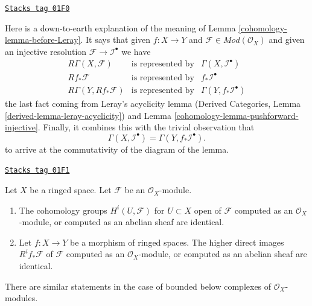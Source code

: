\begin{remark}
\label{cohomology-remark-elucidate-lemma}
\href{https://stacks.math.columbia.edu/tag/01F0}{\texttt{Stacks tag 01F0}}

Here is a down-to-earth explanation of the meaning of
Lemma \ref{cohomology-lemma-before-Leray}. It says that given
$f : X \to Y$ and $\mathcal{F} \in \textit{Mod}(\mathcal{O}_X)$
and given an injective resolution $\mathcal{F} \to \mathcal{I}^\bullet$
we have
$$
\begin{matrix}
R\Gamma(X, \mathcal{F}) & \text{is represented by} &
\Gamma(X, \mathcal{I}^\bullet) \\
Rf_*\mathcal{F} & \text{is represented by} & f_*\mathcal{I}^\bullet \\
R\Gamma(Y, Rf_*\mathcal{F}) & \text{is represented by} &
\Gamma(Y, f_*\mathcal{I}^\bullet)
\end{matrix}
$$
the last fact coming from Leray's acyclicity lemma
(Derived Categories, Lemma \ref{derived-lemma-leray-acyclicity})
and Lemma \ref{cohomology-lemma-pushforward-injective}.
Finally, it combines this with the trivial observation that
$$
\Gamma(X, \mathcal{I}^\bullet)
=
\Gamma(Y, f_*\mathcal{I}^\bullet).
$$
to arrive at the commutativity of the diagram of the lemma.
\end{remark}

\begin{lemma}
\label{cohomology-lemma-modules-abelian}
\href{https://stacks.math.columbia.edu/tag/01F1}{\texttt{Stacks tag 01F1}}

Let $X$ be a ringed space.
Let $\mathcal{F}$ be an $\mathcal{O}_X$-module.
\begin{enumerate}
\item The cohomology groups $H^i(U, \mathcal{F})$ for $U \subset X$ open
of $\mathcal{F}$ computed as an $\mathcal{O}_X$-module, or computed as an
abelian sheaf are identical.
\item Let $f : X \to Y$ be a morphism of ringed spaces.
The higher direct images $R^if_*\mathcal{F}$ of $\mathcal{F}$
computed as an $\mathcal{O}_X$-module, or computed as an abelian sheaf
are identical.
\end{enumerate}
There are similar statements in the case of bounded below
complexes of $\mathcal{O}_X$-modules.
\end{lemma}

